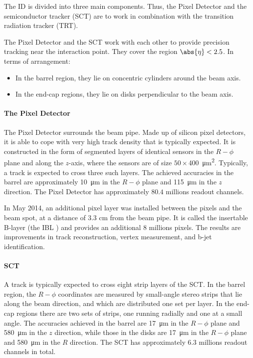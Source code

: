 The ID is divided into three main components. Thus, the Pixel Detector and the
semiconductor tracker (SCT) are to work in combination with the transition
radiation tracker (TRT).

\vspace{5mm}

The Pixel Detector and the SCT work with each other to provide precision
tracking near the interaction point. They cover the region $\abs{\eta}<2.5$. In
terms of arrangement:

\begin{itemize}
	\item In the barrel region, they lie on concentric cylinders around the beam axis.
	\item In the end-cap regions, they lie on disks perpendicular to the beam axis.
\end{itemize}

\paragraph{The Pixel Detector} The Pixel Detector surrounds the beam pipe. Made
up of silicon pixel detectors, it is able to cope with very high track density
that is typically expected. It is constructed in the form of segmented layers of
identical sensors in the $R-\phi$ plane and along the $z$-axis, where the
sensors are of size $50\times$\SI{400}{\micro\meter^2}. Typically, a track is
expected to cross three such layers. The achieved accuracies in the barrel are
approximately \SI{10}{\micro\meter} in the $R-\phi$ plane and
\SI{115}{\micro\meter} in the $z$ direction. The Pixel Detector has
approximately $80.4$ millions readout channels.



In May 2014, an additional pixel layer was installed between the pixels and the
beam spot, at a distance of $3.3$ cm from the beam pipe. It is called the
insertable B-layer (the IBL \cite{atlasblayer}) and provides an additional $8$
millions pixels. The results are improvements in track reconstruction, vertex
measurement, and b-jet identification.

\paragraph{SCT} A track is typically expected to cross eight strip layers of
the SCT. In the barrel region, the $R-\phi$ coordinates are measured by
small-angle stereo strips that lie along the beam direction, and which are
distributed one set per layer. In the end-cap regions there are two sets of
strips, one running radially and one at a small angle. The accuracies achieved
in the barrel are \SI{17}{\micro\meter} in the $R-\phi$ plane and
\SI{580}{\micro\meter} in the $z$ direction, while those in the disks are
\SI{17}{\micro\meter} in the $R-\phi$ plane and \SI{580}{\micro\meter} in the
$R$ direction. The SCT has approximately $6.3$ millions readout channels in
total.

